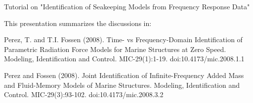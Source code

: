 Tutorial on "Identification of Seakeeping Models from Frequency Response Data"


This presentation summarizes the discussions in:

Perez, T. and T.I. Fossen (2008). Time- vs Frequency-Domain Identification of Parametric Radiation Force Models for Marine
Structures at Zero Speed. Modeling, Identification and Control. MIC-29(1):1-19. doi:10.4173/mic.2008.1.1

Perez and Fossen (2008). Joint Identification of Infinite-Frequency Added Mass and Fluid-Memory Models of Marine Structures.
Modeling, Identification and Control. MIC-29(3):93-102. doi:10.4173/mic.2008.3.2